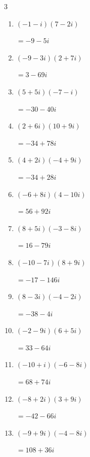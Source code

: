 \begin{multicols}{3}
\begin{enumerate}
  \item $\displaystyle (-1-i)(7-2i)$

        $\displaystyle =-9-5i$

  \item $\displaystyle (-9-3i)(2+7i)$

        $\displaystyle =3-69i$

  \item $\displaystyle (5+5i)(-7-i)$

        $\displaystyle =-30-40i$

  \item $\displaystyle (2+6i)(10+9i)$

        $\displaystyle =-34+78i$

  \item $\displaystyle (4+2i)(-4+9i)$

        $\displaystyle =-34+28i$

  \item $\displaystyle (-6+8i)(4-10i)$

        $\displaystyle =56+92i$

  \item $\displaystyle (8+5i)(-3-8i)$

        $\displaystyle =16-79i$

  \item $\displaystyle (-10-7i)(8+9i)$

        $\displaystyle =-17-146i$

\columnbreak %

\resetques

  \item $\displaystyle (8-3i)(-4-2i)$

        $\displaystyle =-38-4i$

  \item $\displaystyle (-2-9i)(6+5i)$

        $\displaystyle =33-64i$

  \item $\displaystyle (-10+i)(-6-8i)$

        $\displaystyle =68+74i$

  \item $\displaystyle (-8+2i)(3+9i)$

        $\displaystyle =-42-66i$

  \item $\displaystyle (-9+9i)(-4-8i)$

        $\displaystyle =108+36i$


\end{enumerate}
\end{multicols}
